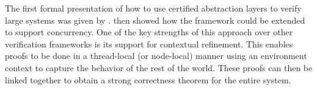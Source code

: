 





The first formal presentation of how to use certified abstraction layers to verify large systems
was given by \citet{deepspec}.
\citet{concurrency} then showed how the framework could be extended to support concurrency.
One of the key strengths of this approach over other verification frameworks
is its support for contextual refinement.
This enables proofs to be done in a thread-local (or node-local) manner using an environment context to
capture the behavior of the rest of the world.
These proofs can then be linked together to obtain a strong correctness theorem for the entire system.

